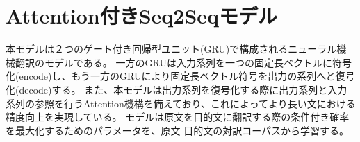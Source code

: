 \documentclass[dvipdfmx,12pt,report]{jsbook}
\begin{document}













\chapter{Attention付きSeq2Seqモデル}

本モデルは２つのゲート付き回帰型ユニット(GRU)で構成されるニューラル機械翻訳のモデルである。
一方のGRUは入力系列を一つの固定長ベクトルに符号化(encode)し、もう一方のGRUにより固定長ベクトル符号を出力の系列へと復号化(decode)する。
また、本モデルは出力系列を復号化する際に出力系列と入力系列の参照を行うAttention機構を備えており、これによってより長い文における精度向上を実現している。
モデルは原文を目的文に翻訳する際の条件付き確率を最大化するためのパラメータを、原文-目的文の対訳コーパスから学習する。
\end{document}
